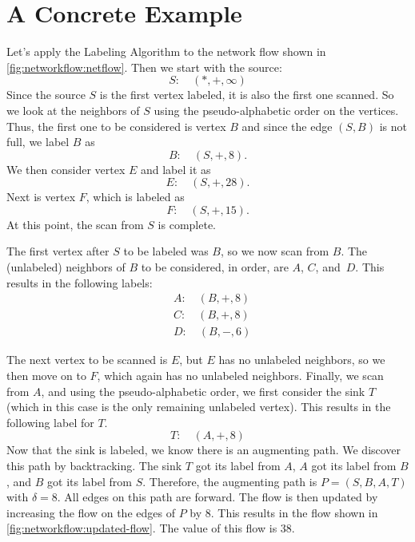 \section{A Concrete Example}\label{s:networkflow:example}

Let's apply the Labeling Algorithm to the network flow shown in
\autoref{fig:networkflow:netflow}.  Then we start with the source:
\[
    S:\quad(*,+,\infty)
\]
Since the source $S$ is the first vertex labeled, it is also the first
one scanned.  So we look at the neighbors of $S$ using the
pseudo-alphabetic order on the vertices. Thus, the first one to be
considered is vertex $B$ and since the edge $(S,B)$ is not full, we
label $B$ as
\[
   B:\quad(S,+,8).
\]
We then consider vertex $E$ and label it as
\[
   E:\quad(S,+,28).
\]
Next is vertex $F$, which is labeled as
\[
   F:\quad(S,+,15).
\]
At this point, the scan from $S$ is complete. 

The first vertex after $S$ to be labeled was $B$, so we now scan from
$B$.  The (unlabeled) neighbors of $B$ to be considered, in order, are
$A$, $C$, and~$D$.  This results in the following labels:
\begin{align*}
  &A:\quad(B,+,8)\\
  &C:\quad(B,+,8)\\
  &D:\quad(B,-,6)
\end{align*} 

The next vertex to be scanned is $E$, but $E$ has no unlabeled
neighbors, so we then move on to $F$, which again has no unlabeled
neighbors.  Finally, we scan from $A$, and using the pseudo-alphabetic
order, we first consider the sink $T$ (which in this case is the only
remaining unlabeled vertex).  This results in the following label for
$T$.
\[
  T:\quad(A,+,8)
\]
Now that the sink is labeled, we know there is an augmenting path.  We
discover this path by backtracking.  The sink $T$ got its label from
$A$, $A$ got its label from $B$, and $B$ got its label from $S$.
Therefore, the augmenting path is $P=(S,B,A,T)$ with $\delta=8$.  All
edges on this path are forward.  The flow is then updated by
increasing the flow on the edges of $P$ by $8$.  This results in the
flow shown in \autoref{fig:networkflow:updated-flow}.  The value of
this flow is $38$.

